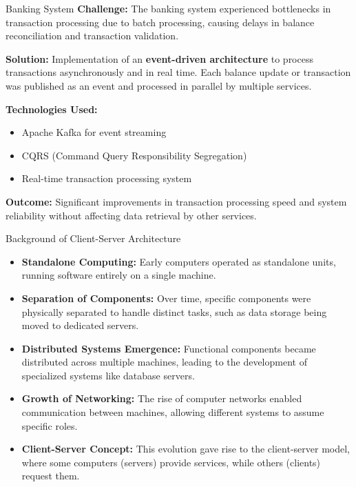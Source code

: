 \documentclass[aspectratio=169, table]{beamer}
\begin{document}
\begin{frame}{\LARGE{Banking System}}
	\vspace{20pt}
	\textbf{Challenge:}  
	The banking system experienced bottlenecks in transaction processing due to batch processing, causing delays in balance reconciliation and transaction validation.
	
	\textbf{Solution:}  
	Implementation of an \textbf{event-driven architecture} to process transactions asynchronously and in real time. Each balance update or transaction was published as an event and processed in parallel by multiple services.
	
	\textbf{Technologies Used:}  
	\begin{itemize}
		\item Apache Kafka for event streaming
		\item CQRS (Command Query Responsibility Segregation)
		\item Real-time transaction processing system
	\end{itemize}
	
	\textbf{Outcome:}  
	Significant improvements in transaction processing speed and system reliability without affecting data retrieval by other services.
\end{frame}


\begin{frame}{Background of Client-Server Architecture}
	\begin{itemize}
		\item \textbf{Standalone Computing:} Early computers operated as standalone units, running software entirely on a single machine.
		\item \textbf{Separation of Components:} Over time, specific components were physically separated to handle distinct tasks, such as data storage being moved to dedicated servers.
		\item \textbf{Distributed Systems Emergence:} Functional components became distributed across multiple machines, leading to the development of specialized systems like database servers.
		\item \textbf{Growth of Networking:} The rise of computer networks enabled communication between machines, allowing different systems to assume specific roles.
		\item \textbf{Client-Server Concept:} This evolution gave rise to the client-server model, where some computers (servers) provide services, while others (clients) request them.
	\end{itemize}
\end{frame}
\end{document}
